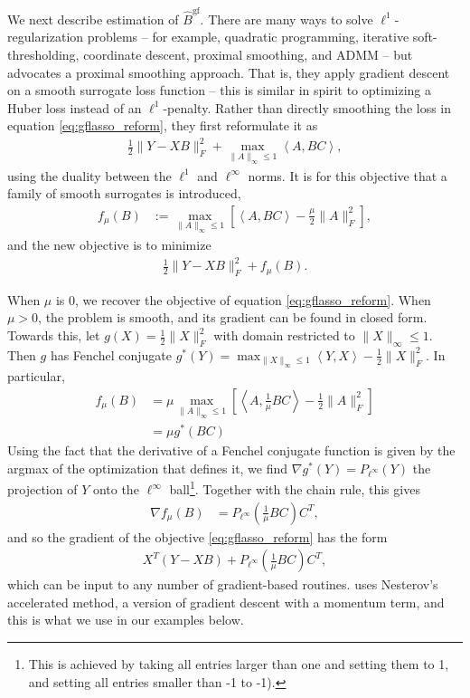 \documentclass[14pt]{extarticle}
\begin{document}
We next describe estimation of $\hat{B}^{\text{gf}}$. There are many ways to
solve $\ell^{1}$-regularization problems -- for example, quadratic programming,
iterative soft-thresholding, coordinate descent, proximal smoothing, and ADMM --
but \cite{chen2010graph} advocates a proximal smoothing approach. That is, they
apply gradient descent on a smooth surrogate loss function -- this is similar in
spirit to optimizing a Huber loss instead of an $\ell^{1}$-penalty. Rather than
directly smoothing the loss in equation \ref{eq:gflasso_reform}, they first
reformulate it as
\begin{align*}
  \frac{1}{2}\|Y - XB\|_{F}^{2} + \max_{\|A\|_{\infty} \leq 1}
  \left<A, BC\right>,
\end{align*}
using the duality between the $\ell^{1}$ and $\ell^{\infty}$ norms. It is
for this objective that a family of smooth surrogates is introduced,
\begin{align*}
f_{\mu}\left(B\right) &:= \max_{\|A\|_{\infty} \leq 1}
\left[\left<A, BC\right> - \frac{\mu}{2}\|A\|_{F}^{2}\right],
\end{align*}
and the new objective is to minimize
\begin{align*}
\frac{1}{2}\|Y - XB\|_{F}^{2} + f_{\mu}\left(B\right).
\end{align*}

When $\mu$ is 0, we recover the objective of equation \ref{eq:gflasso_reform}.
When $\mu > 0$, the problem is smooth, and its gradient can be found in closed
form. Towards this, let $g\left(X\right) = \frac{1}{2}\|X\|_{F}^{2}$ with domain
restricted to $\|X\|_{\infty} \leq 1$. Then $g$ has Fenchel conjugate
$g^{\ast}\left(Y\right) = \max_{\|X\|_{\infty}\leq 1}\left<Y, X\right> -
\frac{1}{2}\|X\|_{F}^{2}$. In particular,
\begin{align*}
f_{\mu}\left(B\right) &=  \mu \max_{\|A\|_{\infty} \leq 1}
\left[\left<A, \frac{1}{\mu}BC\right> - \frac{1}{2}\|A\|_{F}^{2}\right] \\
&= \mu g^{\ast}\left(BC\right)
\end{align*}
Using the fact that the derivative of a Fenchel conjugate function is given by
the argmax of the optimization that defines it, we find $\nabla
g^{\ast}\left(Y\right) = P_{\ell^{\infty}}\left(Y\right)$ the projection of $Y$
onto the $\ell^{\infty}$ ball\footnote{This is achieved by taking all entries
  larger than one and setting them to 1, and setting all entries smaller than -1
  to -1).}. Together with the chain rule, this gives
\begin{align*}
  \nabla f_{\mu}\left(B\right) &= P_{\ell^{\infty}}\left(\frac{1}{\mu}BC\right)C^{T},
\end{align*}
and so the gradient of the objective \ref{eq:gflasso_reform} has the form
\begin{align*}
 X^{T}\left(Y - XB\right) + P_{\ell^{\infty}}\left(\frac{1}{\mu}BC\right)C^{T},
\end{align*}
which can be input to any number of gradient-based routines.
\cite{chen2010graph} uses Nesterov's accelerated method, a version of gradient
descent with a momentum term, and this is what we use in our examples below.
\end{document}

